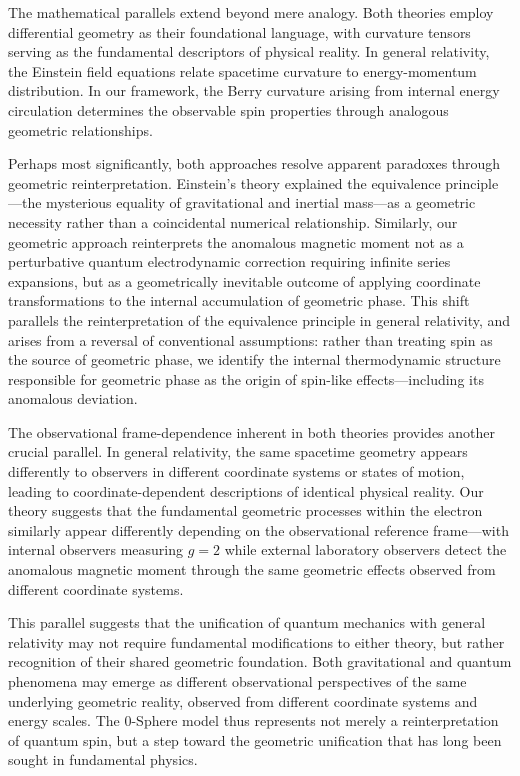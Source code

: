 \documentclass[%
 reprint,
 amsmath,amssymb,
 aps,
]{revtex4-1}
\numberwithin{equation}{section}%
\begin{document}
The mathematical parallels extend beyond mere analogy. Both theories employ differential geometry as their foundational language, with curvature tensors serving as the fundamental descriptors of physical reality. In general relativity, the Einstein field equations relate spacetime curvature to energy-momentum distribution. In our framework, the Berry curvature arising from internal energy circulation determines the observable spin properties through analogous geometric relationships.

Perhaps most significantly, both approaches resolve apparent paradoxes through geometric reinterpretation. Einstein's theory explained the equivalence principle—the mysterious equality of gravitational and inertial mass—as a geometric necessity rather than a coincidental numerical relationship. Similarly, our geometric approach reinterprets the anomalous magnetic moment not as a perturbative quantum electrodynamic correction requiring infinite series expansions, but as a geometrically inevitable outcome of applying coordinate transformations to the internal accumulation of geometric phase. This shift parallels the reinterpretation of the equivalence principle in general relativity, and arises from a reversal of conventional assumptions: rather than treating spin as the source of geometric phase, we identify the internal thermodynamic structure responsible for geometric phase as the origin of spin-like effects—including its anomalous deviation.

The observational frame-dependence inherent in both theories provides another crucial parallel. In general relativity, the same spacetime geometry appears differently to observers in different coordinate systems or states of motion, leading to coordinate-dependent descriptions of identical physical reality. Our theory suggests that the fundamental geometric processes within the electron similarly appear differently depending on the observational reference frame—with internal observers measuring $g = 2$ while external laboratory observers detect the anomalous magnetic moment through the same geometric effects observed from different coordinate systems.

This parallel suggests that the unification of quantum mechanics with general relativity may not require fundamental modifications to either theory, but rather recognition of their shared geometric foundation. Both gravitational and quantum phenomena may emerge as different observational perspectives of the same underlying geometric reality, observed from different coordinate systems and energy scales. The 0-Sphere model thus represents not merely a reinterpretation of quantum spin, but a step toward the geometric unification that has long been sought in fundamental physics.
\end{document}
